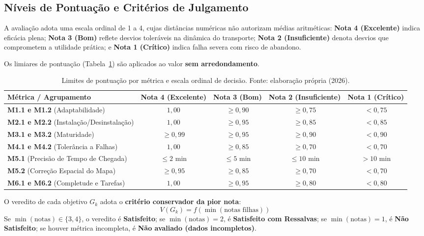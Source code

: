 \documentclass[11pt,a4paper]{article}
\begin{document}
\subsection{Níveis de Pontuação e Critérios de Julgamento}
\label{sec:criterios_julgamento}

A avaliação adota uma escala ordinal de 1 a 4, cujas distâncias numéricas não autorizam médias aritméticas: \textbf{Nota 4 (Excelente)} indica eficácia plena; \textbf{Nota 3 (Bom)} reflete desvios toleráveis na dinâmica do transporte; \textbf{Nota 2 (Insuficiente)} denota desvios que comprometem a utilidade prática; e \textbf{Nota 1 (Crítico)} indica falha severa com risco de abandono.

Os limiares de pontuação (Tabela~\ref{tab:limites_metricas}) são aplicados ao valor \textbf{sem arredondamento}.

\begin{table}[!htbp]
\centering
\caption{Limites de pontuação por métrica e escala ordinal de decisão. Fonte: elaboração própria (2026).}
\label{tab:limites_metricas}
\scriptsize
\renewcommand{\arraystretch}{0.92}
\begin{tabularx}{\textwidth}{X c c c c}
\toprule
\textbf{Métrica / Agrupamento} & \textbf{Nota 4 (Excelente)} & \textbf{Nota 3 (Bom)} & \textbf{Nota 2 (Insuficiente)} & \textbf{Nota 1 (Crítico)} \\
\midrule
\textbf{M1.1 e M1.2} (Adaptabilidade) & $1{,}00$ & $\ge 0{,}90$ & $\ge 0{,}75$ & $< 0{,}75$ \\
\textbf{M2.1 e M2.2} (Instalação/Desinstalação) & $1{,}00$ & $\ge 0{,}95$ & $\ge 0{,}85$ & $< 0{,}85$ \\
\textbf{M3.1 e M3.2} (Maturidade) & $\ge 0{,}99$ & $\ge 0{,}95$ & $\ge 0{,}90$ & $< 0{,}90$ \\
\textbf{M4.1 e M4.2} (Tolerância a Falhas) & $1{,}00$ & $\ge 0{,}85$ & $\ge 0{,}70$ & $< 0{,}70$ \\
\textbf{M5.1} (Precisão de Tempo de Chegada) & $\le 2\text{ min}$ & $\le 5\text{ min}$ & $\le 10\text{ min}$ & $> 10\text{ min}$ \\
\textbf{M5.2} (Correção Espacial do Mapa) & $\ge 0{,}95$ & $\ge 0{,}85$ & $\ge 0{,}70$ & $< 0{,}70$ \\
\textbf{M6.1 e M6.2} (Completude e Tarefas) & $1{,}00$ & $\ge 0{,}95$ & $\ge 0{,}80$ & $< 0{,}80$ \\
\bottomrule
\end{tabularx}
\end{table}

O veredito de cada objetivo $G_k$ adota o \textbf{critério conservador da pior nota}:
\begin{equation}
    V(G_k) = f(\min(\text{notas filhas}))
\end{equation}
Se $\min(\text{notas}) \in \{3, 4\}$, o veredito é \textbf{Satisfeito}; se $\min(\text{notas}) = 2$, é \textbf{Satisfeito com Ressalvas}; se $\min(\text{notas}) = 1$, é \textbf{Não Satisfeito}; se houver métrica incompleta, é \textbf{Não avaliado (dados incompletos)}.
\end{document}
